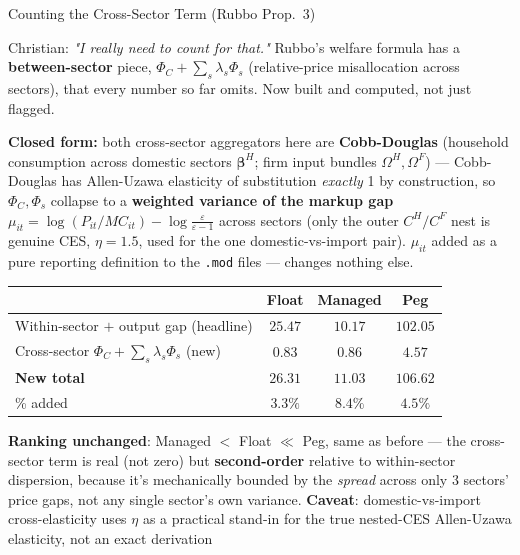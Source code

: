 \documentclass[aspectratio=43, 10pt]{beamer}
\begin{document}
\begin{frame}{Counting the Cross-Sector Term (Rubbo Prop.\ 3)}

{\footnotesize Christian: \emph{"I really need to count for that."} Rubbo's welfare formula has a \textbf{between-sector} piece, $\Phi_C+\sum_s\lambda_s\Phi_s$ (relative-price misallocation across sectors), that every number so far omits. Now built and computed, not just flagged.}

\vspace{4pt}
{\scriptsize \textbf{Closed form:} both cross-sector aggregators here are \textbf{Cobb-Douglas} (household consumption across domestic sectors $\bm\beta^H$; firm input bundles $\Omega^H,\Omega^F$) --- Cobb-Douglas has Allen-Uzawa elasticity of substitution \emph{exactly} 1 by construction, so $\Phi_C,\Phi_s$ collapse to a \textbf{weighted variance of the markup gap} $\mu_{it}=\log(P_{it}/MC_{it})-\log\frac{\varepsilon}{\varepsilon-1}$ across sectors (only the outer $C^H/C^F$ nest is genuine CES, $\eta{=}1.5$, used for the one domestic-vs-import pair). $\mu_{it}$ added as a pure reporting definition to the \texttt{.mod} files --- changes nothing else.}

\vspace{5pt}
\begin{center}
{\scriptsize
\renewcommand{\arraystretch}{1.3}
\begin{tabular}{@{}lccc@{}}
\toprule
& \textbf{Float} & \textbf{Managed} & \textbf{Peg} \\
\midrule
Within-sector $+$ output gap (headline) & $25.47$ & $10.17$ & $102.05$ \\
Cross-sector $\Phi_C+\sum_s\lambda_s\Phi_s$ (new) & $0.83$ & $0.86$ & $4.57$ \\
\textbf{New total} & $\mathbf{26.31}$ & $\mathbf{11.03}$ & $\mathbf{106.62}$ \\
\% added & $3.3\%$ & $8.4\%$ & $4.5\%$ \\
\bottomrule
\end{tabular}}
\end{center}

\vspace{4pt}
{\scriptsize \textbf{Ranking unchanged}: Managed $<$ Float $\ll$ Peg, same as before --- the cross-sector term is real (not zero) but \textbf{second-order} relative to within-sector dispersion, because it's mechanically bounded by the \emph{spread} across only 3 sectors' price gaps, not any single sector's own variance. \textbf{Caveat}: domestic-vs-import cross-elasticity uses $\eta$ as a practical stand-in for the true nested-CES Allen-Uzawa elasticity, not an exact derivation}

\end{frame}
\end{document}
